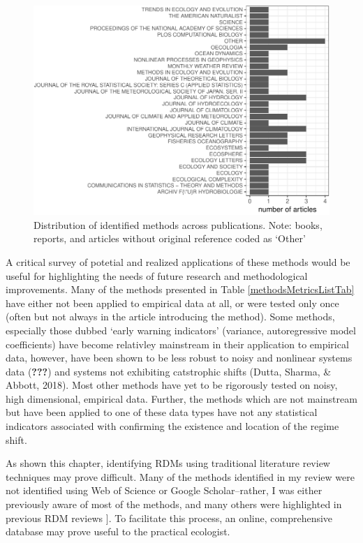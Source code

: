 \documentclass[12pt,twoside,openany]{reedthesis}
\begin{document}
\begin{figure}
\centering
\includegraphics{_myDissertation_files/figure-latex/jrnlDistFig-1.pdf}
\caption{\label{fig:jrnlDistFig}Distribution of identified methods across
publications. Note: books, reports, and articles without original
reference coded as `Other'}
\end{figure}
A critical survey of potetial and realized applications of these methods
would be useful for highlighting the needs of future research and
methodological improvements. Many of the methods presented in Table
\ref{methodsMetricsListTab} have either not been applied to empirical
data at all, or were tested only once (often but not always in the
article introducing the method). Some methods, especially those dubbed
`early warning indicators' (variance, autoregressive model coefficients)
have become relativley mainstream in their application to empirical
data, however, have been shown to be less robust to noisy and nonlinear
systems data ({\textbf{???}}) and systems not exhibiting catstrophic
shifts (Dutta, Sharma, \& Abbott, 2018). Most other methods have yet to
be rigorously tested on noisy, high dimensional, empirical data.
Further, the methods which are not mainstream but have been applied to
one of these data types have not any statistical indicators associated
with confirming the existence and location of the regime shift.

As shown this chapter, identifying RDMs using traditional literature
review techniques may prove difficult. Many of the methods identified in
my review were not identified using Web of Science or Google
Scholar--rather, I was either previously aware of most of the methods,
and many others were highlighted in previous RDM reviews {]}. To
facilitate this process, an online, comprehensive database may prove
useful to the practical ecologist.
\end{document}
